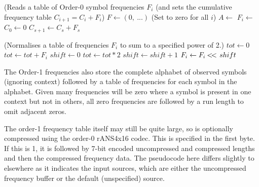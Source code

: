 \documentclass[a4paper]{article}
\begin{document}
\vskip 0.5cm

\begin{algorithmic}[1]
\Statex (Reads a table of Order-0 symbol frequencies $F_i$
\Statex (and sets the cumulative frequency table $C_{i+1} = C_i+F_i$)
\State $F \gets (0,\ ...)$ \Comment(Set to zero for all $i$)
\State $A \gets$ 
  \State $F_i \gets$ 
\EndForeach
\State
\State {}
\State
\State $C_0 \gets 0$
  \State $C_{s+1} \gets C_s + F_s$
\EndFor
\EndProcedure
\end{algorithmic}

\begin{algorithmic}[1]
\Statex (Normalises a table of frequencies $F_i$ to sum to a specified power of 2.)
\State $tot \gets 0$
  \State $tot \gets tot + F_i$
\EndFor
{}
  \State \Return
\EndIf
\State
\State $shift \gets 0$
  \State $tot \gets tot*2$
  \State $shift \gets shift+1$
\EndWhile
\State
{}
  \State $F_i \gets F_i \mathbin{<\mkern-3mu<\,} shift$
\EndFor
\EndProcedure
\end{algorithmic}

The Order-1 frequencies also store the complete alphabet of
observed symbols (ignoring context) followed by a table of frequencies for
each symbol in the alphabet.  Given many frequencies will be zero
where a symbol is present in one context but not in others, all zero
frequencies are followed by a run length to omit adjacent zeros.

The order-1 frequency table itself may still be quite large, so is
optionally compressed using the order-0 rANS4x16 codec.  This is
specified in the first byte.  If this is 1, it is followed by 7-bit
encoded uncompressed and compressed lengths and then the compressed
frequency data.  The pseudocode here differs slightly to elsewhere as
it indicates the input sources, which are either the uncompressed
frequency buffer or the default (unspecified) source.

\end{document}
